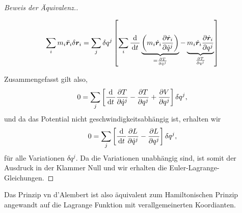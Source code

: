 \begin{proof}[Beweis der Äquivalenz.]
\begin{itemize}
\begin{align*}
\sum_i m_i\ddot{\bm{r}}_i \delta\bm{r}_i = \sum_j \delta q^j \left[\sum_i
\frac{\mathrm{d}}{\,\mathrm{d} t\,}\underbrace{\left( m_i\dot{\bm{r}}_i \frac{\partial
\dot{\bm{r}}_i}{\partial \dot{q}^j}\right)}_{=\frac{\partial T}{\partial \dot{q}^j}}
- \underbrace{m_i\dot{\bm{r}}_i \frac{\partial \dot{\bm{r}}_i}{\partial
q^j}}_{\frac{\partial T}{\partial q^j}}\right]
\end{align*}
\end{itemize}
Zusammengefasst gilt also,
\begin{align*}
0 = \sum_j \left[\frac{\mathrm{d}}{\,\mathrm{d} t\,}\frac{\partial T}{\partial
\dot{q}^j}-\frac{\partial T}{\partial q^j} + \frac{\partial V}{\partial
q^j} \right]\delta q^j,
\end{align*}
und da das Potential nicht geschwindigkeitsabhängig ist, erhalten wir
\begin{align*}
0 = \sum_j \left[\frac{\mathrm{d}}{\,\mathrm{d} t\,}\frac{\partial L}{\partial
\dot{q}^j}-\frac{\partial L}{\partial q^j}\right]\delta q^j,
\end{align*}
für alle Variationen $\delta q^j$. Da die Variationen unabhängig sind, ist
somit der Ausdruck in der Klammer Null und wir erhalten die
Euler-Lagrange-Gleichungen.\qedhere
\end{proof}

Das Prinzip vn d'Alembert ist also äquivalent zum Hamiltonischen Prinzip
angewandt auf die Lagrange Funktion mit verallgemeinerten Koordianten.

